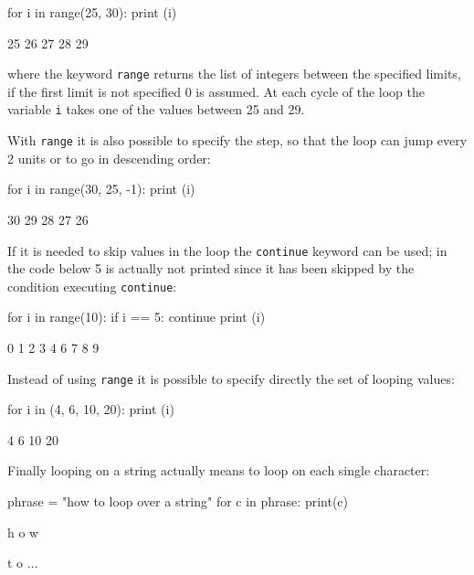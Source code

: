 \begin{ipythonnon}
for i in range(25, 30):
    print (i)	
\end{ipythonnon}
\begin{ioutput}
25
26
27
28
29	
\end{ioutput}
\noindent
where the keyword \texttt{range} returns the list of integers between the specified limits, if the first limit is not specified 0 is assumed.
At each cycle of the loop the variable \texttt{i} takes one of the values between 25 and 29. 

With \texttt{range} it is also possible to specify the step, so that the loop can jump every 2 units or to go in descending order:

\begin{ipythonnon}
for i in range(30, 25, -1):
    print (i)	
\end{ipythonnon}
\begin{ioutput}
30
29
28
27
26	
\end{ioutput}

If it is needed to skip values in the loop the \texttt{continue} keyword can be used; in the code below 5 is actually not printed since it has been skipped by the condition executing \texttt{continue}:

\begin{ipythonnon}
for i in range(10):
    if i == 5:
        continue
    print (i)	
\end{ipythonnon}
\begin{ioutput}
0
1
2
3
4
6
7
8
9	
\end{ioutput}

Instead of using \texttt{range} it is possible to specify directly the set of looping values:

\begin{ipythonnon}
for i in (4, 6, 10, 20):
    print (i)	
\end{ipythonnon}
\begin{ioutput}
4
6
10
20	
\end{ioutput}

Finally looping on a string actually means to loop on each single character:
 
\begin{ipythonnon}
phrase = "how to loop over a string"
for c in phrase:
    print(c) 	
\end{ipythonnon}
\begin{ioutput}
h
o
w

t
o
...
\end{ioutput}
 
